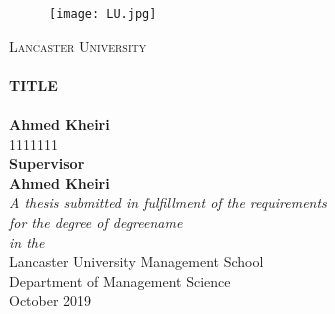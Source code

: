\begin{titlepage}
\begin{center}

\begin{figure}[htbp]
\centering
\texttt{[image: LU.jpg]}
\end{figure}

\textsc{\LARGE Lancaster University}\\[0.7cm] 
\HRule \\[0.4cm]
{\huge \bfseries TITLE}\\[0.4cm]
\HRule \\[0.7cm]
{\LARGE \bfseries Ahmed Kheiri}\\[0.4cm]
{\LARGE  1111111 }\\[1cm]
{\large  \bfseries Supervisor }\\[0.4cm]
{\large \bfseries Ahmed Kheiri}\\[1cm]
\large \textit{A thesis submitted in fulfillment of the requirements\\ for the degree of degreename}\\[0.3cm] %
\textit{in the}\\[0.4cm]
Lancaster University Management School \\
Department of Management Science\\[1cm] %
{\large October 2019}\\[4cm]
\vfill
\end{center}
\end{titlepage}
